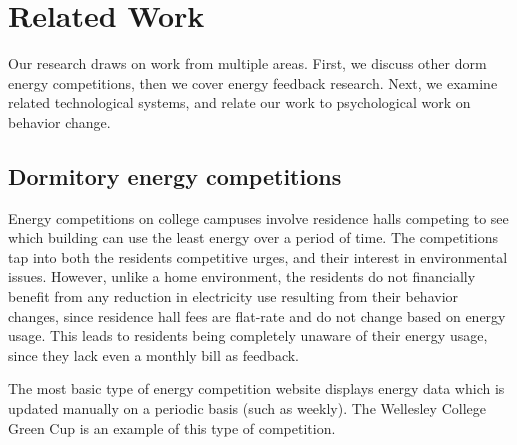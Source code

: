 
\section{Related Work}
\label{sec:related-work}

Our research draws on work from multiple areas. First, we discuss other dorm energy competitions, then we cover energy feedback research. Next, we examine related technological systems, and relate our work to psychological work on behavior change.

\subsection{Dormitory energy competitions}

Energy competitions on college campuses involve residence halls competing to see which building can use the least energy over a period of time. The competitions tap into both the residents competitive urges, and their interest in environmental issues. However, unlike a home environment, the residents do not financially benefit from any reduction in electricity use resulting from their behavior changes, since residence hall fees are flat-rate and do not change based on energy usage. This leads to residents being completely unaware of their energy usage, since they lack even a monthly bill as feedback.

The most basic type of energy competition website displays energy data which is updated manually on a periodic basis (such as weekly). The Wellesley College Green Cup \cite{wellesley-green-cup} is an example of this type of competition. 

